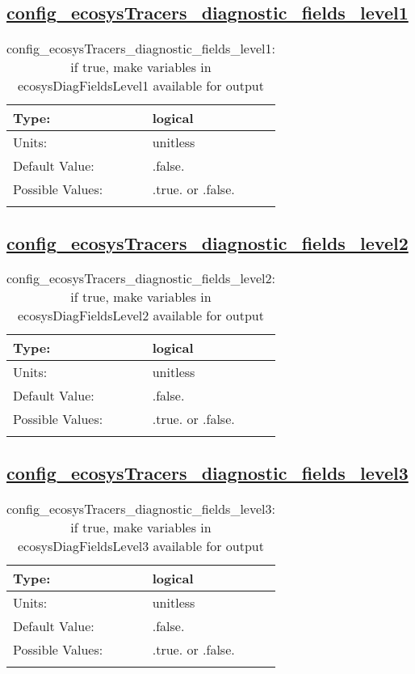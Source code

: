 \subsection[config\_ecosysTracers\_diagnostic\_fields\_level1]{\hyperref[sec:nm_tab_tracer_forcing_ecosysTracers]{config\_ecosysTracers\_diagnostic\_fields\_level1}}
\label{subsec:nm_sec_config_ecosysTracers_diagnostic_fields_level1}
\begin{center}
\begin{longtable}{| p{2.0in} || p{4.0in} |}
    \hline
    Type: & logical \\
    \hline
    Units: & \si{unitless} \\
    \hline
    Default Value: & .false. \\
    \hline
    Possible Values: & .true. or .false. \\
    \hline
    \caption{config\_ecosysTracers\_diagnostic\_fields\_level1: if true, make variables in ecosysDiagFieldsLevel1 available for output}
\end{longtable}
\end{center}
\subsection[config\_ecosysTracers\_diagnostic\_fields\_level2]{\hyperref[sec:nm_tab_tracer_forcing_ecosysTracers]{config\_ecosysTracers\_diagnostic\_fields\_level2}}
\label{subsec:nm_sec_config_ecosysTracers_diagnostic_fields_level2}
\begin{center}
\begin{longtable}{| p{2.0in} || p{4.0in} |}
    \hline
    Type: & logical \\
    \hline
    Units: & \si{unitless} \\
    \hline
    Default Value: & .false. \\
    \hline
    Possible Values: & .true. or .false. \\
    \hline
    \caption{config\_ecosysTracers\_diagnostic\_fields\_level2: if true, make variables in ecosysDiagFieldsLevel2 available for output}
\end{longtable}
\end{center}
\subsection[config\_ecosysTracers\_diagnostic\_fields\_level3]{\hyperref[sec:nm_tab_tracer_forcing_ecosysTracers]{config\_ecosysTracers\_diagnostic\_fields\_level3}}
\label{subsec:nm_sec_config_ecosysTracers_diagnostic_fields_level3}
\begin{center}
\begin{longtable}{| p{2.0in} || p{4.0in} |}
    \hline
    Type: & logical \\
    \hline
    Units: & \si{unitless} \\
    \hline
    Default Value: & .false. \\
    \hline
    Possible Values: & .true. or .false. \\
    \hline
    \caption{config\_ecosysTracers\_diagnostic\_fields\_level3: if true, make variables in ecosysDiagFieldsLevel3 available for output}
\end{longtable}
\end{center}
